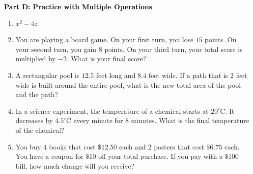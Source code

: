 \documentclass[12pt, letterpaper, fleqn]{article}
\begin{document}
\newpage

\begin{tcolorbox}[colback=customteal!20]
\large\textcolor{black}{\textbf{Part D: Practice with Multiple Operations}}
\end{tcolorbox}

\vspace{3mm}

\begin{enumerate}[itemsep=4.2cm, leftmargin=0.6cm, resume]
\item $x^2 - 4z$
\item You are playing a board game. On your first turn, you lose $15$ points. On your second turn, you gain $8$ points. On your third turn, your total score is multiplied by $-2$. What is your final score?
\item A rectangular pool is $12.5$ feet long and $8.4$ feet wide. If a path that is $2$ feet wide is built around the entire pool, what is the new total area of the pool and the path?
\item In a science experiment, the temperature of a chemical starts at $20^\circ$C. It decreases by $4.5^\circ$C every minute for $8$ minutes. What is the final temperature of the chemical?
\item You buy $4$ books that cost $\$12.50$ each and $2$ posters that cost $\$6.75$ each. You have a coupon for $\$10$ off your total purchase. If you pay with a $\$100$ bill, how much change will you receive?
\end{enumerate}
\end{document}

